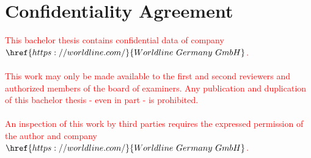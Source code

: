\section*{Confidentiality Agreement}
\textcolor{red}{
This bachelor thesis contains confidential data of company $\href{https://worldline.com/}{Worldline \ Germany \ GmbH }$.\\ \\
This work may only be made available to the first and second reviewers and authorized members of the board of examiners. Any publication and duplication of this bachelor thesis - even in part - is prohibited.\\\\
 An inspection of this work by third parties requires the expressed permission of the author and company $\href{https://worldline.com/}{Worldline \ Germany \ GmbH }$.
}